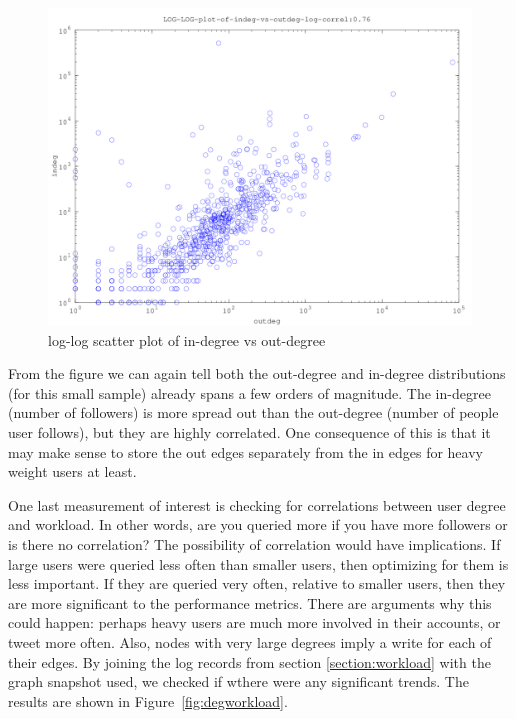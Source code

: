 \begin{figure}
\centering
   \includegraphics[width=\gridscale]{figures/LOG-LOG-plot-of-indeg-vs-outdeg-log-correl076.png}
   \caption{log-log scatter plot of in-degree vs out-degree}
   \label{fig:degcorr}
\end{figure}



From the figure we can again tell both the out-degree and in-degree distributions (for this small sample) already spans a few orders of magnitude. The in-degree (number of followers) is more spread out than the out-degree (number of people user follows), but they are highly correlated.  One consequence of this is that it may make sense to store the out edges separately from the in edges for heavy weight users at least.

One last measurement of interest is checking for correlations between user degree and workload. In other words, are you queried more if you have more followers or is there no correlation? The possibility of correlation would have implications. If large users were queried less often than smaller users, then optimizing for them is less important. If they are queried very often, relative to smaller users, then they are more significant to the performance metrics. There are arguments why this could happen: perhaps heavy users are much more involved in their accounts, or tweet more often.  Also, nodes with very large degrees imply a write for each of their edges.     By joining the log records from section \ref{section:workload} with the graph snapshot  used, we checked if wthere were any significant trends. The results are shown in Figure~\ref{fig:degworkload}.

